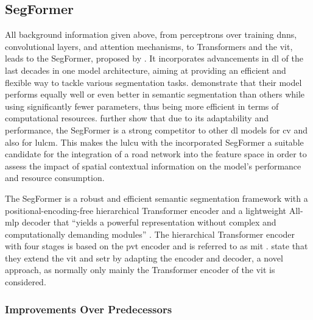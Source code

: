 \subsection{SegFormer}
\label{subsec:segformer}

All background information given above, from perceptrons over training \glspl{dnn}, convolutional layers, and attention mechanisms, to Transformers and the \gls{vit}, leads to the SegFormer, proposed by \textcite{Xie.Wang.ea2021}. It incorporates advancements in \gls{dl} of the last decades in one model architecture, aiming at providing an efficient and flexible way to tackle various segmentation tasks. \textcite{Xie.Wang.ea2021} demonstrate that their model performs equally well or even better in semantic segmentation than others while using significantly fewer parameters, thus being more efficient in terms of computational resources. \textcite{Chen.Liu.ea2023,Lin.Cheng.ea2023,Tzepkenlis.Marthoglou.ea2023} further show that due to its adaptability and performance, the SegFormer is a strong competitor to other \gls{dl} models for \gls{cv} and also for \gls{lulcm}. This makes the \gls{lulcu} with the incorporated SegFormer a suitable candidate for the integration of a road network into the feature space in order to assess the impact of spatial contextual information on the model's performance and resource consumption.

The SegFormer is a robust and efficient semantic segmentation framework with a positional-encoding-free hierarchical Transformer encoder and a lightweight All-\gls{mlp} decoder that \enquote{yields a powerful representation without complex and computationally demanding modules} \autocite[2]{Xie.Wang.ea2021}. The hierarchical Transformer encoder with four stages is based on the \gls{pvt} encoder and is referred to as \gls{mit} \autocite{Khan.Naseer.ea2021,Liu.Zhang.ea2024}. \textcite{Xie.Wang.ea2021} state that they extend the \gls{vit} and \gls{setr} by adapting the encoder and decoder, a novel approach, as normally only mainly the Transformer encoder of the \gls{vit} is considered.

\subsubsection*{Improvements Over Predecessors} 

